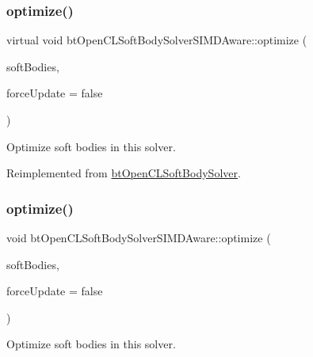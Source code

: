 \subsubsection{\texorpdfstring{optimize()}{optimize()}\hspace{0.1cm}{\footnotesize\ttfamily [1/2]}}
{\footnotesize\ttfamily virtual void bt\+Open\+C\+L\+Soft\+Body\+Solver\+S\+I\+M\+D\+Aware\+::optimize (\begin{DoxyParamCaption}\item[{\hyperlink{classbtAlignedObjectArray}{bt\+Aligned\+Object\+Array}$<$ \hyperlink{classbtSoftBody}{bt\+Soft\+Body} $\ast$ $>$ \&}]{soft\+Bodies,  }\item[{bool}]{force\+Update = {\ttfamily false} }\end{DoxyParamCaption})\hspace{0.3cm}{\ttfamily [virtual]}}

Optimize soft bodies in this solver. 

Reimplemented from \hyperlink{classbtOpenCLSoftBodySolver_a1340686f32dcdd4e8f36a56788a2e51c}{bt\+Open\+C\+L\+Soft\+Body\+Solver}.

\mbox{\label{classbtOpenCLSoftBodySolverSIMDAware_ad1052da1c0e61eac7d9fe1df618c150c}} 
\subsubsection{\texorpdfstring{optimize()}{optimize()}\hspace{0.1cm}{\footnotesize\ttfamily [2/2]}}
{\footnotesize\ttfamily void bt\+Open\+C\+L\+Soft\+Body\+Solver\+S\+I\+M\+D\+Aware\+::optimize (\begin{DoxyParamCaption}\item[{\hyperlink{classbtAlignedObjectArray}{bt\+Aligned\+Object\+Array}$<$ \hyperlink{classbtSoftBody}{bt\+Soft\+Body} $\ast$ $>$ \&}]{soft\+Bodies,  }\item[{bool}]{force\+Update = {\ttfamily false} }\end{DoxyParamCaption})\hspace{0.3cm}{\ttfamily [virtual]}}

Optimize soft bodies in this solver. 


